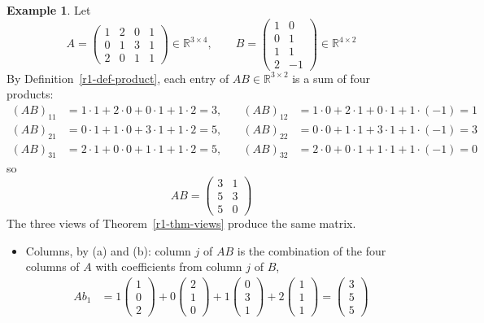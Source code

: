 \documentclass[12pt]{article}
\newcommand{\R}{\mathbb R}
\theoremstyle{definition}
\newtheorem{example}[theorem]{Example}
\begin{document}
\begin{example}\label{r1-exm-views}
Let
\[
A=\begin{pmatrix}1&2&0&1\\0&1&3&1\\2&0&1&1\end{pmatrix}\in\R^{3\times4},\qquad
B=\begin{pmatrix}1&0\\0&1\\1&1\\2&-1\end{pmatrix}\in\R^{4\times2}
\]
By Definition~\ref{r1-def-product}, each entry of \(AB\in\R^{3\times2}\) is a sum of four
products:
\[
\begin{aligned}
(AB)_{11}&=1\cdot1+2\cdot0+0\cdot1+1\cdot2=3, &\quad (AB)_{12}&=1\cdot0+2\cdot1+0\cdot1+1\cdot(-1)=1\\
(AB)_{21}&=0\cdot1+1\cdot0+3\cdot1+1\cdot2=5, &\quad (AB)_{22}&=0\cdot0+1\cdot1+3\cdot1+1\cdot(-1)=3\\
(AB)_{31}&=2\cdot1+0\cdot0+1\cdot1+1\cdot2=5, &\quad (AB)_{32}&=2\cdot0+0\cdot1+1\cdot1+1\cdot(-1)=0
\end{aligned}
\]
so
\[
AB=\begin{pmatrix}3&1\\5&3\\5&0\end{pmatrix}
\]
The three views of Theorem~\ref{r1-thm-views} produce the same matrix.
\begin{itemize}
\item Columns, by (a) and (b): column \(j\) of \(AB\) is the combination of the four columns
of \(A\) with coefficients from column \(j\) of \(B\),
\[
\begin{aligned}
Ab_1&=1\begin{pmatrix}1\\0\\2\end{pmatrix}+0\begin{pmatrix}2\\1\\0\end{pmatrix}
+1\begin{pmatrix}0\\3\\1\end{pmatrix}+2\begin{pmatrix}1\\1\\1\end{pmatrix}=\begin{pmatrix}3\\5\\5\end{pmatrix}\\

\end{aligned}\]
\end{itemize}
\end{example}
\end{document}
